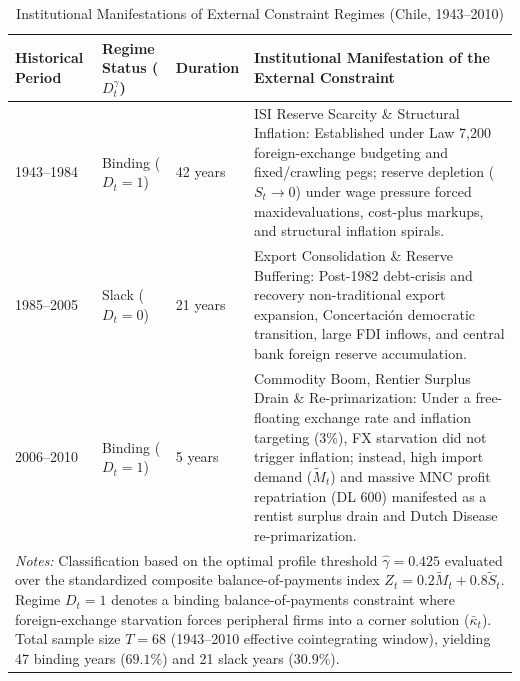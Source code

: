 \begin{table}[h!]
	\centering
	\caption{Institutional Manifestations of External Constraint Regimes (Chile, 1943--2010)}
	\label{tab:chile_binding_regimes}
	\small
	\begin{tabular}{p{2.0cm} p{1.8cm} p{1.0cm} p{7.2cm}}
		\hline
		Historical Period & Regime Status ($D_t^\gamma$) & Duration & Institutional Manifestation of the External Constraint \\
		\hline
		1943--1984 & Binding ($D_t = 1$) & 42 years & ISI Reserve Scarcity \& Structural Inflation: Established under Law 7,200 foreign-exchange budgeting and fixed/crawling pegs; reserve depletion ($S_t \to 0$) under wage pressure forced maxidevaluations, cost-plus markups, and structural inflation spirals. \\
		\hline
		1985--2005 & Slack ($D_t = 0$) & 21 years & Export Consolidation \& Reserve Buffering: Post-1982 debt-crisis and recovery non-traditional export expansion, Concertación democratic transition, large FDI inflows, and central bank foreign reserve accumulation. \\
		\hline
		2006--2010 & Binding ($D_t = 1$) & 5 years & Commodity Boom, Rentier Surplus Drain \& Re-primarization: Under a free-floating exchange rate and inflation targeting (3\%), FX starvation did not trigger inflation; instead, high import demand ($\tilde{M}_t$) and massive MNC profit repatriation (DL 600) manifested as a rentist surplus drain and Dutch Disease re-primarization. \\
		\hline
		\multicolumn{4}{p{14.2cm}}{\footnotesize \textit{Notes:} Classification based on the optimal profile threshold $\hat{\gamma} = 0.425$ evaluated over the standardized composite balance-of-payments index $Z_t = 0.2 \tilde{M}_t + 0.8 \tilde{S}_t$. Regime $D_t = 1$ denotes a binding balance-of-payments constraint where foreign-exchange starvation forces peripheral firms into a corner solution ($\bar{\kappa}_t$). Total sample size $T = 68$ (1943--2010 effective cointegrating window), yielding 47 binding years ($69.1\%$) and 21 slack years ($30.9\%$).} \\
	\end{tabular}
\end{table}
